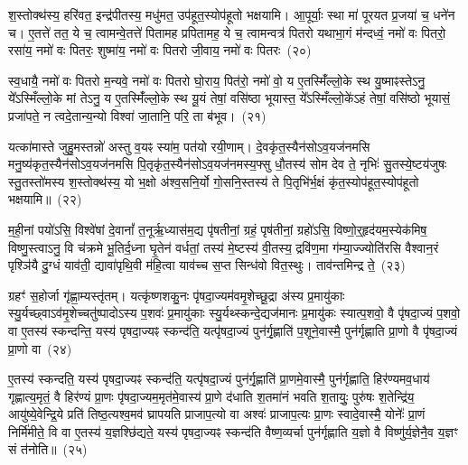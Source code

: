 श॒स्तोक्थ॑स्य॒ हरि॑वत॒ इन्द्र॑पीतस्य॒ मधु॑मत॒ उप॑हूत॒स्योप॑हूतो भक्षयामि। आ॒पूर्याः॒ स्था मा॑ पूरयत प्र॒जया॑ च॒ धने॑न च। ए॒तत्ते॑ तत॒ ये च॒ त्वामन्वे॒तत्ते॑ पितामह प्रपितामह॒ ये च॒ त्वामन्वत्र॑ पितरो यथाभा॒गं म॑न्दध्वं॒ नमो॑ वः पितरो॒ रसा॑य॒ नमो॑ वः पितरः॒ शुष्मा॑य॒ नमो॑ वः पितरो जी॒वाय॒ नमो॑ वः पितरः~(२०)

स्व॒धायै॒ नमो॑ वः पितरो म॒न्यवे॒ नमो॑ वः पितरो घो॒राय॒ पित॑रो॒ नमो॑ वो॒ य ए॒तस्मिँ॑ल्लो॒के स्थ यु॒ष्माꣴस्ते\-ऽनु॒ ये᳚\-ऽस्मिँल्लो॒के मां ते\-ऽनु॒ य ए॒तस्मिँ॑ल्लो॒के स्थ यू॒यं तेषां॒ वसि॑ष्ठा भूयास्त॒ ये᳚\-ऽस्मिँल्लो॒के॑\-ऽहं तेषां॒ वसि॑ष्ठो भूयासं॒ प्रजा॑पते॒ न त्वदे॒तान्य॒न्यो विश्वा॑ जा॒तानि॒ परि॒ ता ब॑भूव।~(२१)

यत्का॑मास्ते जुहु॒मस्तन्नो॑ अस्तु व॒यꣴ स्या॑म॒ पत॑यो रयी॒णाम्। दे॒वकृ॑त॒स्यैन॑सो\-ऽव॒यज॑नमसि मनु॒ष्य॑कृत॒स्यैन॑सो\-ऽ\-व॒यज॑नमसि पि॒तृकृ॑त॒स्यैन॑सो\-ऽव॒यज॑नमस्य॒फ्सु धौ॒तस्य॑ सोम देव ते॒ नृभिः॑ सु॒तस्ये॒ष्टय॑जुषः स्तु॒तस्तो॑मस्य श॒स्तोक्थ॑स्य॒ यो भ॒क्षो अ॑श्व॒सनि॒र्यो गो॒सनि॒स्तस्य॑ ते पि॒तृभि॑र्भ॒क्षं कृ॑त॒स्योप॑हूत॒स्योप॑हूतो भक्षयामि॥~(२२)

{}%

म॒ही॒नां पयो॑\-ऽसि॒ विश्वे॑षां दे॒वानां᳚ त॒नूर्\mbox{}ऋ॒ध्यास॑म॒द्य पृ॑षतीनां॒ ग्रहं॒ पृष॑तीनां॒ ग्रहो॑\-ऽसि॒ विष्णो॒र्॒\mbox{}हृद॑यम॒स्येक॑मिष॒ विष्णु॒स्त्वा\-ऽनु॒ वि च॑क्रमे भू॒तिर्द॒ध्ना घृ॒तेन॑ वर्धतां॒ तस्य॑ मे॒ष्टस्य॑ वी॒तस्य॒ द्रवि॑ण॒मा ग॑म्या॒ज्ज्योति॑रसि वैश्वान॒रं पृश्ञि॑यै दु॒ग्धं याव॑ती॒ द्यावा॑पृथि॒वी म॑हि॒त्वा याव॑च्च स॒प्त सिन्ध॑वो वित॒स्थुः। ताव॑न्तमिन्द्र ते॒~(२३)

ग्रहꣳ॑ स॒होर्जा गृ॑ह्णा॒म्यस्तृ॑तम्। यत्कृ॑ष्णशकु॒नः पृ॑षदा॒ज्यम॑व\-मृ॒शेच्छू॒द्रा अ॑स्य प्र॒मायु॑काः स्यु॒र्यच्छ्वा\-ऽव॑मृ॒शेच्चतु॑ष्पादो\-ऽस्य प॒शवः॑ प्र॒मायु॑काः स्यु॒र्यथ्स्कन्दे॒द्यज॑मानः प्र॒मायु॑कः स्यात्प॒शवो॒ वै पृ॑षदा॒ज्यं प॒शवो॒ वा ए॒तस्य॑ स्कन्दन्ति॒ यस्य॑ पृषदा॒ज्यꣴ स्कन्द॑ति॒ यत्पृ॑षदा॒ज्यं पुन॑र्गृ॒ह्णाति॑ प॒शूने॒वास्मै॒ पुन॑र्गृह्णाति प्रा॒णो वै पृ॑षदा॒ज्यं प्रा॒णो वा~(२४)

ए॒तस्य॑ स्कन्दति॒ यस्य॑ पृषदा॒ज्यꣴ स्कन्द॑ति॒ यत्पृ॑षदा॒ज्यं पुन॑र्गृ॒ह्णाति॑ प्रा॒णमे॒वास्मै॒ पुन॑र्गृह्णाति॒ हिर॑ण्यमव॒धाय॑ गृह्णात्य॒मृतं॒ वै हिर॑ण्यं प्रा॒णः पृ॑षदा॒ज्यम॒मृत॑मे॒वास्य॑ प्रा॒णे द॑धाति श॒तमा॑नं भवति श॒तायुः॒ पुरु॑षः श॒तेन्द्रि॑य॒ आयु॑ष्ये॒वेन्द्रि॒ये प्रति॑ तिष्ठ॒त्यश्व॒मव॑ घ्रापयति प्राजाप॒त्यो वा अश्वः॑ प्राजाप॒त्यः प्रा॒णः स्वादे॒वास्मै॒ योनेः᳚ प्रा॒णं निर्मि॑मीते॒ वि वा ए॒तस्य॑ य॒ज्ञश्छि॑द्यते॒ यस्य॑ पृषदा॒ज्यꣴ स्कन्द॑ति वैष्ण॒व्यर्चा पुन॑र्गृह्णाति य॒ज्ञो वै विष्णु॑र्य॒ज्ञेनै॒व य॒ज्ञꣳ सं त॑नोति॥~(२५)


